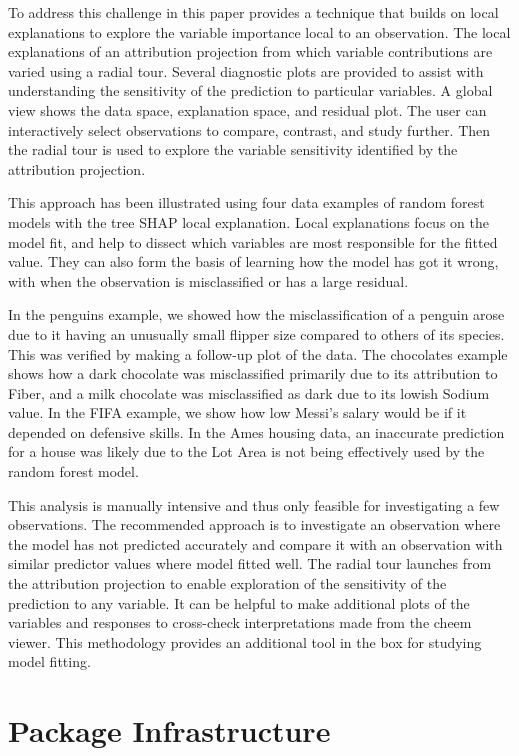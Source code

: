 \documentclass[
]{jss}
\begin{document}
To address this challenge in this paper provides a technique that builds
on local explanations to explore the variable importance local to an
observation. The local explanations of an attribution projection from
which variable contributions are varied using a radial tour. Several
diagnostic plots are provided to assist with understanding the
sensitivity of the prediction to particular variables. A global view
shows the data space, explanation space, and residual plot. The user can
interactively select observations to compare, contrast, and study
further. Then the radial tour is used to explore the variable
sensitivity identified by the attribution projection.

This approach has been illustrated using four data examples of random
forest models with the tree SHAP local explanation. Local explanations
focus on the model fit, and help to dissect which variables are most
responsible for the fitted value. They can also form the basis of
learning how the model has got it wrong, with when the observation is
misclassified or has a large residual.

In the penguins example, we showed how the misclassification of a
penguin arose due to it having an unusually small flipper size compared
to others of its species. This was verified by making a follow-up plot
of the data. The chocolates example shows how a dark chocolate was
misclassified primarily due to its attribution to Fiber, and a milk
chocolate was misclassified as dark due to its lowish Sodium value. In
the FIFA example, we show how low Messi's salary would be if it depended
on defensive skills. In the Ames housing data, an inaccurate prediction
for a house was likely due to the Lot Area is not being effectively used
by the random forest model.

This analysis is manually intensive and thus only feasible for
investigating a few observations. The recommended approach is to
investigate an observation where the model has not predicted accurately
and compare it with an observation with similar predictor values where
model fitted well. The radial tour launches from the attribution
projection to enable exploration of the sensitivity of the prediction to
any variable. It can be helpful to make additional plots of the
variables and responses to cross-check interpretations made from the
cheem viewer. This methodology provides an additional tool in the box
for studying model fitting.

\hypertarget{sec:infrastructure}{%
\section{Package Infrastructure}\label{sec:infrastructure}}
\end{document}
